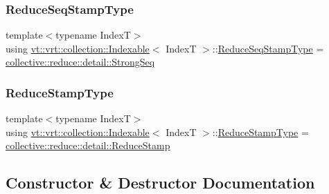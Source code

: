 \mbox{\label{structvt_1_1vrt_1_1collection_1_1_indexable_af259d608ccabcbe13680763fe5f1c656}} 
\subsubsection{\texorpdfstring{Reduce\+Seq\+Stamp\+Type}{ReduceSeqStampType}}
{\footnotesize\ttfamily template$<$typename IndexT$>$ \\
using \hyperlink{structvt_1_1vrt_1_1collection_1_1_indexable}{vt\+::vrt\+::collection\+::\+Indexable}$<$ IndexT $>$\+::\hyperlink{structvt_1_1vrt_1_1collection_1_1_indexable_af259d608ccabcbe13680763fe5f1c656}{Reduce\+Seq\+Stamp\+Type} =  \hyperlink{namespacevt_1_1collective_1_1reduce_1_1detail_affec2854d7d65bafb17eb259714e9443}{collective\+::reduce\+::detail\+::\+Strong\+Seq}}

\mbox{\label{structvt_1_1vrt_1_1collection_1_1_indexable_a0369a8abcf13550caec736365f7fb30f}} 
\subsubsection{\texorpdfstring{Reduce\+Stamp\+Type}{ReduceStampType}}
{\footnotesize\ttfamily template$<$typename IndexT$>$ \\
using \hyperlink{structvt_1_1vrt_1_1collection_1_1_indexable}{vt\+::vrt\+::collection\+::\+Indexable}$<$ IndexT $>$\+::\hyperlink{structvt_1_1vrt_1_1collection_1_1_indexable_a0369a8abcf13550caec736365f7fb30f}{Reduce\+Stamp\+Type} =  \hyperlink{namespacevt_1_1collective_1_1reduce_1_1detail_aacc1fcd729d934ba143fee3a943bf9e7}{collective\+::reduce\+::detail\+::\+Reduce\+Stamp}}



\subsection{Constructor \& Destructor Documentation}
\mbox{\label{structvt_1_1vrt_1_1collection_1_1_indexable_ad3f327a35771a31ec63241b9be57569c}} 
